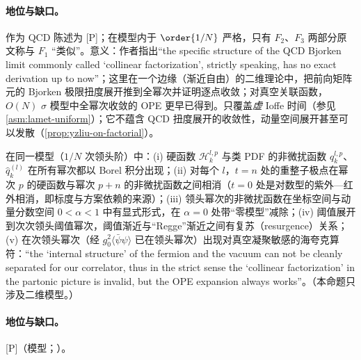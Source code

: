 \paragraph{地位与缺口。}作为 QCD 陈述为 [P]；在模型内于 $\order{1/N}$ 严格，只有 $F_2$、$F_3$ 两部分原文称与 $F_1$ “类似”。意义：作者指出“the specific structure of the QCD Bjorken limit commonly called `collinear factorization', strictly speaking, has no exact derivation up to now”\cite[第~1~节]{Liu:2024omb}；这里在一个边缘（渐近自由）的二维理论中，把前向矩阵元的 Bjorken 极限扭度展开推到全幂次并证明逐点收敛；对真空关联函数，$O(N)$ $\sigma$ 模型中全幂次收敛的 OPE 更早已得到\cite{Beneke:1998eq}。只覆盖\emph{虚} Ioffe 时间（参见\cref{asm:lamet-uniform}）；它不蕴含 QCD 扭度展开的收敛性，动量空间展开甚至可以发散（\cref{prop:yzliu-on-factorial}）。

\begin{proposition}\label{prop:yzliu-gn-structure}
在同一模型（$1/N$ 次领头阶）中：(i) 硬函数 $\mathcal H^{l,p}_k$ 与类 PDF 的非微扰函数 $q^{l,p}_k$、$\hat q^{(l)}_k$ 在所有幂次都以 Borel 积分出现；(ii) 对每个 $l$，$t=n$ 处的重整子极点在幂次 $p$ 的硬函数与幂次 $p+n$ 的非微扰函数之间相消（$t=0$ 处是对数型的紫外—红外相消，即标度与方案依赖的来源）；(iii) 领头幂次的非微扰函数在坐标空间与动量分数空间 $0<\alpha<1$ 中有显式形式，在 $\alpha=0$ 处带“零模型”减除；(iv) 阈值展开到次次领头阈值幂次，阈值渐近与“Regge”渐近之间有复苏（resurgence）关系；(v) 在次领头幂次（经 $g_0^2\langle\bar\psi\psi\rangle$ 已在领头幂次）出现对真空凝聚敏感的海夸克算符：“the `internal structure' of the fermion and the vacuum can not be cleanly separated for our correlator, thus in the strict sense the `collinear factorization' in the partonic picture is invalid, but the OPE expansion always works”\cite[第~2.4~节]{Liu:2024omb}。（本命题只涉及二维模型。）
\end{proposition}

\paragraph{地位与缺口。}[P]（模型；\cite[第~1--2.1、4、7~节]{Liu:2024omb}）。

